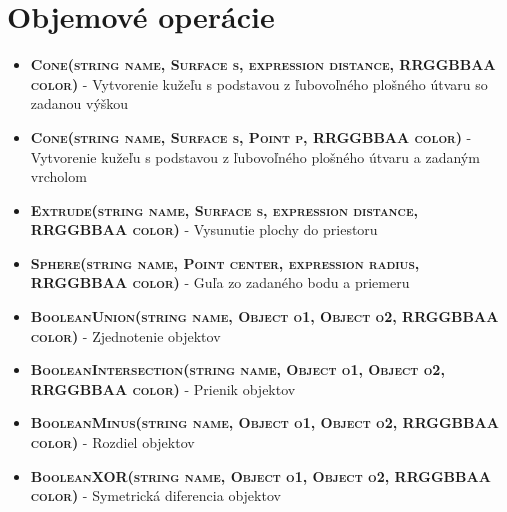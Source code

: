 \section*{Objemové operácie}

\begin{itemize}
\item \textsc{\textbf{Cone(string name, Surface s, expression distance, RRGGBBAA color)}} - Vytvorenie kužeľu s podstavou z ľubovoľného plošného útvaru so zadanou výškou%

\item \textsc{\textbf{Cone(string name, Surface s, Point p, RRGGBBAA color)}} - Vytvorenie kužeľu s podstavou z ľubovoľného plošného útvaru a zadaným vrcholom%

\item \textsc{\textbf{Extrude(string name, Surface s, expression distance, RRGGBBAA color)}}  - Vysunutie plochy do priestoru%


\item \textsc{\textbf{Sphere(string name, Point center, expression radius, RRGGBBAA color)}} - Guľa zo zadaného bodu a priemeru

\item \textsc{\textbf{BooleanUnion(string name, Object o1, Object o2, RRGGBBAA color)}} - Zjednotenie objektov
\item \textsc{\textbf{BooleanIntersection(string name, Object o1, Object o2, RRGGBBAA color)}} - Prienik objektov%
\item \textsc{\textbf{BooleanMinus(string name, Object o1, Object o2, RRGGBBAA color)}} - Rozdiel objektov%
\item \textsc{\textbf{BooleanXOR(string name, Object o1, Object o2, RRGGBBAA color)}} - Symetrická diferencia objektov%
\end{itemize}


